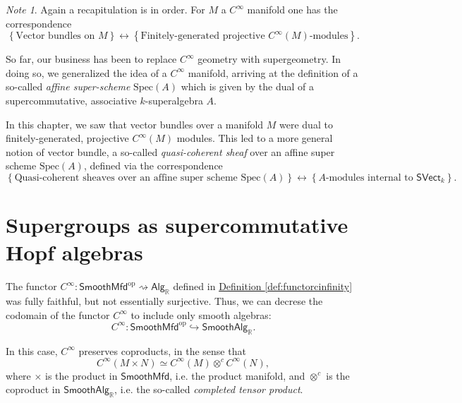 \documentclass[a4paper]{report}
\newcommand{\R}{\mathbb{R}}
\newcommand{\Spec}{\mathrm{Spec}}
\theoremstyle{definition}
\theoremstyle{plain}
\theoremstyle{remark}
\newtheorem{note}{Note}[section]
\begin{document}
\begin{note}
  Again a recapitulation is in order. For $M$ a $C^{\infty}$ manifold one has the correspondence
  \begin{equation*}
    \left\{ \text{Vector bundles on $M$} \right\} \longleftrightarrow \left\{ \text{Finitely-generated projective $C^{\infty}(M)$-modules} \right\}.
  \end{equation*}

  So far, our business has been to replace $C^{\infty}$ geometry with supergeometry. In doing so, we generalized the idea of a $C^{\infty}$ manifold, arriving at the definition of a so-called \emph{affine super-scheme} $\Spec(A)$ which is given by the dual of a supercommutative, associative $k$-superalgebra $A$.

  In this chapter, we saw that vector bundles over a manifold $M$ were dual to finitely-generated, projective $C^{\infty}(M)$ modules. This led to a more general notion of vector bundle, a so-called \emph{quasi-coherent sheaf} over an affine super scheme $\Spec(A)$, defined via the correspondence
  \begin{equation*}
    \left\{ \text{Quasi-coherent sheaves over an affine super scheme $\Spec(A)$} \right\} \longleftrightarrow \left\{ \text{$A$-modules internal to $\mathsf{SVect}_{k}$} \right\}.
  \end{equation*}
\end{note}

\section{Supergroups as supercommutative Hopf algebras}

The functor $C^{\infty}\colon \mathsf{SmoothMfd}^{\mathrm{op}} \rightsquigarrow \mathsf{Alg}_{\R}$ defined in \hyperref[def:functorcinfinity]{Definition \ref*{def:functorcinfinity}} was fully faithful, but not essentially surjective. Thus, we can decrese the codomain of the functor $C^{\infty}$ to include only smooth algebras:
\begin{equation*}
  C^{\infty}\colon \mathsf{SmoothMfd}^{\mathrm{op}} \hookrightarrow \mathsf{SmoothAlg}_{\R}.
\end{equation*}

In this case, $C^{\infty}$ preserves coproducts, in the sense that
\begin{equation*}
  C^{\infty}(M \times N) \simeq C^{\infty}(M) \otimes^{c} C^{\infty}(N),
\end{equation*}
where $\times$ is the product in $\mathsf{SmoothMfd}$, i.e. the product manifold, and $\otimes^{c}$ is the coproduct in $\mathsf{SmoothAlg}_{\R}$, i.e. the so-called \emph{completed tensor product}.
\end{document}
